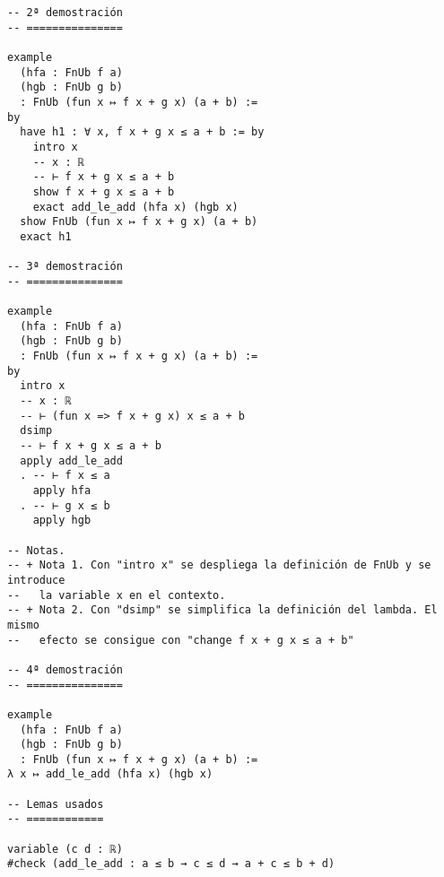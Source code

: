 \begin{verbatim}
-- 2ª demostración
-- ===============

example
  (hfa : FnUb f a)
  (hgb : FnUb g b)
  : FnUb (fun x ↦ f x + g x) (a + b) :=
by
  have h1 : ∀ x, f x + g x ≤ a + b := by
    intro x
    -- x : ℝ
    -- ⊢ f x + g x ≤ a + b
    show f x + g x ≤ a + b
    exact add_le_add (hfa x) (hgb x)
  show FnUb (fun x ↦ f x + g x) (a + b)
  exact h1

-- 3ª demostración
-- ===============

example
  (hfa : FnUb f a)
  (hgb : FnUb g b)
  : FnUb (fun x ↦ f x + g x) (a + b) :=
by
  intro x
  -- x : ℝ
  -- ⊢ (fun x => f x + g x) x ≤ a + b
  dsimp
  -- ⊢ f x + g x ≤ a + b
  apply add_le_add
  . -- ⊢ f x ≤ a
    apply hfa
  . -- ⊢ g x ≤ b
    apply hgb

-- Notas.
-- + Nota 1. Con "intro x" se despliega la definición de FnUb y se introduce
--   la variable x en el contexto.
-- + Nota 2. Con "dsimp" se simplifica la definición del lambda. El mismo
--   efecto se consigue con "change f x + g x ≤ a + b"

-- 4ª demostración
-- ===============

example
  (hfa : FnUb f a)
  (hgb : FnUb g b)
  : FnUb (fun x ↦ f x + g x) (a + b) :=
λ x ↦ add_le_add (hfa x) (hgb x)

-- Lemas usados
-- ============

variable (c d : ℝ)
#check (add_le_add : a ≤ b → c ≤ d → a + c ≤ b + d)
\end{verbatim}


